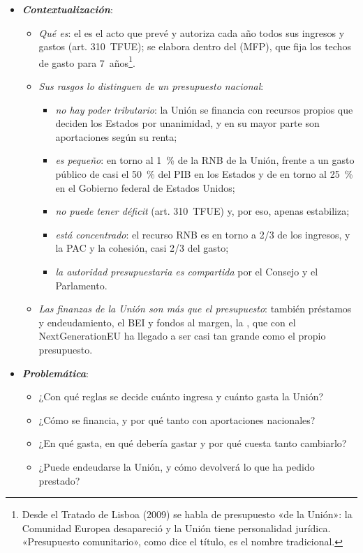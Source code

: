 \documentclass[11pt]{article}
\begin{document}
\begin{itemize}
\item \textbf{\emph{Contextualización}}:
  \begin{itemize}
  \item \emph{Qué es}: el  es el acto que prevé y autoriza cada año todos sus ingresos y gastos (art. 310~TFUE); se elabora dentro del  (MFP), que fija los techos de gasto para 7~años\footnote{Desde el Tratado de Lisboa (2009) se habla de presupuesto «de la Unión»: la Comunidad Europea desapareció y la Unión tiene personalidad jurídica. «Presupuesto comunitario», como dice el título, es el nombre tradicional.}.
  \item \emph{Sus rasgos lo distinguen de un presupuesto nacional}:
    \begin{itemize}
    \item \emph{no hay poder tributario}: la Unión se financia con recursos propios que deciden los Estados por unanimidad, y en su mayor parte son aportaciones según su renta;
    \item \emph{es pequeño}: en torno al 1~\% de la RNB de la Unión, frente a un gasto público de casi el 50~\% del PIB en los Estados y de en torno al 25~\% en el Gobierno federal de Estados Unidos;
    \item \emph{no puede tener déficit} (art. 310~TFUE) y, por eso, apenas estabiliza;
    \item \emph{está concentrado}: el recurso RNB es en torno a 2/3 de los ingresos, y la PAC y la cohesión, casi 2/3 del gasto;
    \item \emph{la autoridad presupuestaria es compartida} por el Consejo y el Parlamento.
    \end{itemize}
  \item \emph{Las finanzas de la Unión son más que el presupuesto}: también préstamos y endeudamiento, el BEI y fondos al margen, la , que con el NextGenerationEU ha llegado a ser casi tan grande como el propio presupuesto.
  \end{itemize}

\item \textbf{\emph{Problemática}}:
  \begin{itemize}
  \item ¿Con qué reglas se decide cuánto ingresa y cuánto gasta la Unión?
  \item ¿Cómo se financia, y por qué tanto con aportaciones nacionales?
  \item ¿En qué gasta, en qué debería gastar y por qué cuesta tanto cambiarlo?
  \item ¿Puede endeudarse la Unión, y cómo devolverá lo que ha pedido prestado?
  \end{itemize}


\end{itemize}
\end{document}
